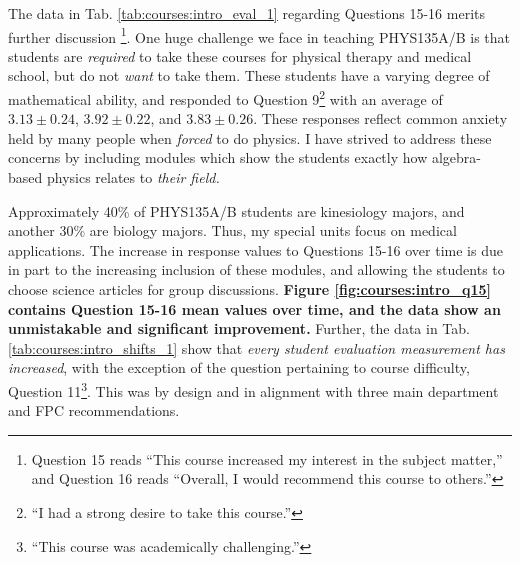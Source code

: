 \documentclass[../../main.tex]{subfiles}
\begin{document}
The data in Tab. \ref{tab:courses:intro_eval_1} regarding Questions 15-16 merits further discussion \footnote{Question 15 reads ``This course increased my interest in the subject matter,'' and Question 16 reads ``Overall, I would recommend this course to others.''}.  One huge challenge we face in teaching PHYS135A/B is that students are \textit{required} to take these courses for physical therapy and medical school, but do not \textit{want} to take them.  These students have a varying degree of mathematical ability, and responded to Question 9\footnote{``I had a strong desire to take this course.''} with an average of $3.13 \pm 0.24$, $3.92 \pm 0.22$, and $3.83 \pm 0.26$.  These responses reflect common anxiety held by many people when \textit{forced} to do physics.  I have strived to address these concerns by including modules which show the students exactly how algebra-based physics relates to \textit{their field.} \\ \hspace{0.1cm}

Approximately 40\% of PHYS135A/B students are kinesiology majors, and another 30\% are biology majors.  Thus, my special units focus on medical applications.  The increase in response values to Questions 15-16 over time is due in part to the increasing inclusion of these modules, and allowing the students to choose science articles for group discussions.  \textbf{Figure  \ref{fig:courses:intro_q15} contains Question 15-16 mean values over time, and the data show an unmistakable and significant improvement.}  Further, the data in Tab. \ref{tab:courses:intro_shifts_1} show that \textit{every student evaluation measurement has increased}, with the exception of the question pertaining to course difficulty, Question 11\footnote{``This course was academically challenging.''}.  This was by design and in alignment with three main department and FPC recommendations. \\ \hspace{0.1cm}
\end{document}
